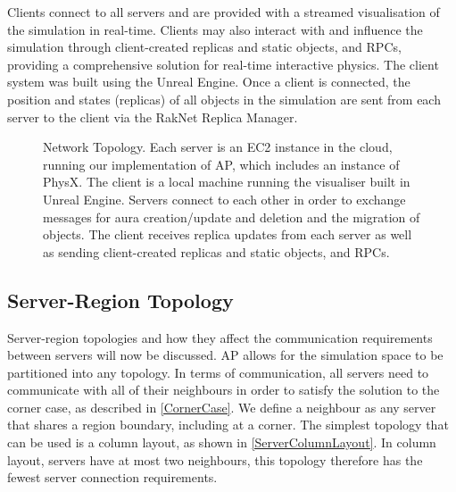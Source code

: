 Clients connect to all servers and are provided with a streamed visualisation of the simulation in real-time. Clients may also interact with and influence the simulation through client-created replicas and static objects, and RPCs, providing a comprehensive solution for real-time interactive physics. The client system was built using the Unreal Engine. Once a client is connected, the position and states (replicas) of all objects in the simulation are sent from each server to the client via the RakNet Replica Manager.


\begin{figure}[h]
	\centering
	\scalebox{1.5}{}
	\caption{Network Topology. Each server is an EC2 instance in the cloud, running our implementation of AP, which includes an instance of PhysX. The client is a local machine running the visualiser built in Unreal Engine. Servers connect to each other in order to exchange messages for aura creation/update and deletion and the migration of objects. The client receives replica updates from each server as well as sending client-created replicas and static objects, and RPCs.}
\end{figure}

\subsection{Server-Region Topology}
Server-region topologies and how they affect the communication requirements between servers will now be discussed. 
AP allows for the simulation space to be partitioned into any topology. In terms of communication, all servers need to communicate with all of their neighbours in order to satisfy the solution to the corner case, as described in \ref{CornerCase}. We define a neighbour as any server that shares a region boundary, including at a corner. The simplest topology that can be used is a column layout, as shown in \ref{ServerColumnLayout}. In column layout, servers have at most two neighbours, this topology therefore has the fewest server connection requirements.


